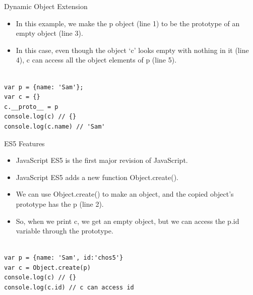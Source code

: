 \begin{frame}[fragile]{Dynamic Object Extension}

\begin{itemize}
	\item In this example, we make the p object (line 1) to be the prototype of an empty object (line 3). 
	\item In this case, even though the object `c' looks empty with nothing in it (line 4), c can access all the object elements of p (line 5). 
\end{itemize}

\begin{Code}{}%
\begin{lstlisting}[firstnumber=1, label=glabels, xleftmargin=0pt, basicstyle=\scriptsize]% 

var p = {name: 'Sam'};
var c = {}
c.__proto__ = p
console.log(c) // {}
console.log(c.name) // 'Sam'
\end{lstlisting}%
\end{Code}%
\end{frame}

\begin{frame}[fragile]{ES5 Features}

\begin{itemize}
	\item JavaScript ES5 is the first major revision of JavaScript. 
	\item JavaScript ES5 adds a new function Object.create(). 
	\item We can use Object.create() to make an object, and the copied object's prototype has the p (line 2). 
	\item So, when we print c, we get an empty object, but we can access the p.id variable through the prototype.
\end{itemize}

\begin{Code}{}%
\begin{lstlisting}[firstnumber=1, label=glabels, xleftmargin=0pt, basicstyle=\scriptsize]% 

var p = {name: 'Sam', id:'chos5'}
var c = Object.create(p)
console.log(c) // {}
console.log(c.id) // c can access id
\end{lstlisting}%
\end{Code}%

\end{frame}

